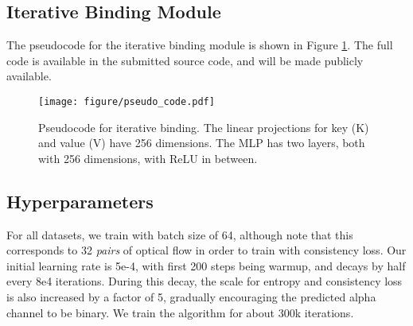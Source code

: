\subsection{Iterative Binding Module}
The pseudocode for the iterative binding module is shown in Figure \ref{fig:code}. 
The full code is available in the submitted source code, and will be made publicly available.

\begin{figure}[!htb]
\texttt{[image: figure/pseudo\_code.pdf]}
\centering
\caption{Pseudocode for iterative binding. The linear projections for key (K) and value (V) have 256 dimensions. The MLP has two layers, both with 256 dimensions, with ReLU in between. }
\label{fig:code}
\end{figure}

\subsection{Hyperparameters}
For all datasets, we train with batch size of 64, 
although note that this corresponds to 32 \textit{pairs} of optical flow in order to train with consistency loss. 
Our initial learning rate is 5e-4, with first 200 steps being warmup,
and decays by half every 8e4 iterations. 
During this decay, the scale for entropy and consistency loss is also increased by a factor of 5,
gradually encouraging the predicted alpha channel to be binary.
We train the algorithm for about 300k iterations.




